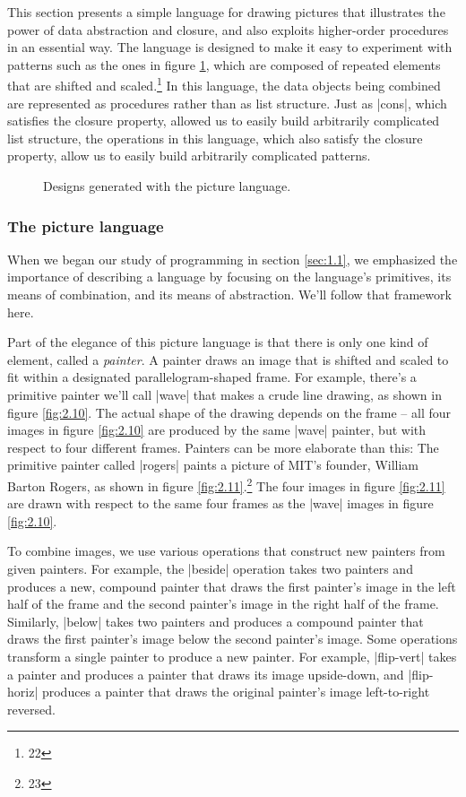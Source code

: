 \begin{Exercise}
\begin{Exercise}
\begin{Exercise}
This section presents a simple language for drawing pictures that
illustrates the power of data abstraction and closure, and also
exploits higher-order procedures in an essential way.  The language is
designed to make it easy to experiment with patterns such as the ones
in figure \ref{fig:2.9}, which are composed of repeated elements that
are shifted and scaled.\footnote{22} In this language, the data
objects being combined are represented as procedures rather than as
list structure.  Just as \scheme|cons|, which satisfies the closure
property, allowed us to easily build arbitrarily complicated list
structure, the operations in this language, which also satisfy the
closure property, allow us to easily build arbitrarily complicated
patterns.

\begin{figure}
\placeholder{}
\caption{Designs generated with the picture language.}
\label{fig:2.9}
\end{figure}


\subsubsection*{The picture language}

When we began our study of programming in section \ref{sec:1.1}, we
emphasized the importance of describing a language by focusing on the
language's primitives, its means of combination, and its means of
abstraction.  We'll follow that framework here.

Part of the elegance of this picture language is that there is only
one kind of element, called a \textit{painter}.  A painter draws an
image that is shifted and scaled to fit within a designated
parallelogram-shaped frame.  For example, there's a primitive painter
we'll call \scheme|wave| that makes a crude line drawing, as shown in
figure \ref{fig:2.10}.  The actual shape of the drawing depends on the
frame -- all four images in figure \ref{fig:2.10} are produced by the
same \scheme|wave| painter, but with respect to four different frames.
Painters can be more elaborate than this: The primitive painter called
\scheme|rogers| paints a picture of MIT's founder, William Barton
Rogers, as shown in figure \ref{fig:2.11}.\footnote{23} The four
images in figure \ref{fig:2.11} are drawn with respect to the same
four frames as the \scheme|wave| images in figure \ref{fig:2.10}.


To combine images, we use various operations that construct new
painters from given painters.  For example, the \scheme|beside|
operation takes two painters and produces a new, compound painter that
draws the first painter's image in the left half of the frame and the
second painter's image in the right half of the frame.  Similarly,
\scheme|below| takes two painters and produces a compound painter that
draws the first painter's image below the second painter's image.
Some operations transform a single painter to produce a new painter.
For example, \scheme|flip-vert| takes a painter and produces a painter
that draws its image upside-down, and \scheme|flip-horiz| produces a
painter that draws the original painter's image left-to-right
reversed.


\end{Exercise}
\end{Exercise}
\end{Exercise}
